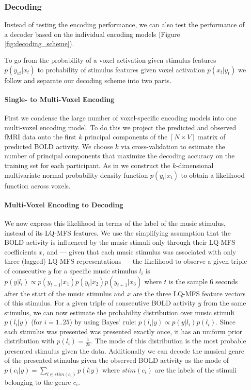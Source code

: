 \subsubsection*{Decoding}

Instead of testing the encoding performance, we can also test the performance
of a decoder based on the individual encoding models \citep{NG11} (Figure
\ref{fig:decoding_scheme}).

To go from the probability of a voxel activation
given stimulus features $p(y_{vt}|x_{t})$ to probability of stimulus features
given voxel activation $p(x_{t}|y_{t})$ we follow \citet{NG09} and separate our
decoding scheme into two parts. 

\paragraph{Single- to Multi-Voxel Encoding}

First we condense the large number of voxel-specific encoding models into one
multi-voxel encoding model.  To do this we project the predicted and observed
f{MRI} data onto the first $k$ principal components of the $[N\times V]$ matrix
of predicted BOLD activity. We choose $k$ via cross-validation to estimate the
number of principal components that maximize the decoding accuracy on the
training set for each participant.
As in \citet{NG09} we construct the $k$-dimensional multivariate normal
probability density function $p(y_{t}|x_{t})$ to obtain a likelihood function
across voxels. 

\paragraph{Multi-Voxel Encoding to Decoding}

We now express this likelihood in terms of the label of the music stimulus, instead of its LQ-MFS features.  We
use the simplifying assumption that the BOLD activity is influenced by the
music stimuli only through their LQ-MFS coefficients $x$, and --- given that
each music stimulus was associated with only three (lagged) LQ-MFS
representations --- the likelihood to observe a given triple of consecutive $y$
for a specific music stimulus $l_{i}$ is $p(y|l_{i}) \propto
p(y_{t-1}|x_{1})p(y_{t}|x_{2})p(y_{t+1}|x_{3})$ where $t$ is the sample 6
seconds after the start of the music stimulus and $x$ are the three LQ-MFS
feature vectors of this stimulus.  For a given triple of consecutive BOLD
activity $y$ from the same stimulus, we can now estimate the probability
distribution over music stimuli $p(l_{i}|y)$ (for $i=1..25$) by using Bayes'
rule: $p(l_{i}|y) \propto p(y|l_{i})p(l_{i})$.
Since each stimulus was presented was presented exactly once,
it has an uniform prior distribution with $p(l_{i})=\frac{1}{25}$. The mode of
this distribution is the most probable presented stimulus given the data. 
Additionally we can decode the musical genre of the presented stimulus given the observed
BOLD activity as the mode of $p(c_{i}|y) = \sum\nolimits_{l \in
  stim(c_{i})} p(l|y)$ where $stim(c_{i})$ are the labels of the stimuli
  belonging to the genre $c_{i}$. 


